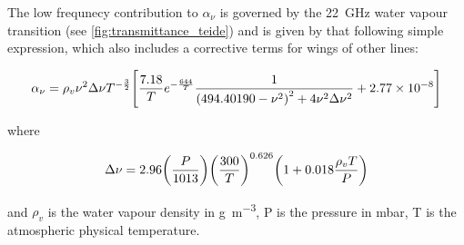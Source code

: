 The low frequnecy contribution to $\alpha_\nu$ is governed by the
\SI{22}{\giga\hertz} water vapour transition (see
\autoref{fig:transmittance_teide}) and is given by that following simple
expression, which also includes a corrective terms for wings of other
lines:

\begin{equation}
        \alpha_\nu = \rho_v\nu^2\Delta \nu T^{-\frac{3}{2}}
        \qty[\frac{7.18}{T} e^{-\frac{644}{T}}
        \frac{1}{\qty(494.40190 - \nu^2)^2 + 4\nu^2\Delta \nu^2}
        + \num{2.77e-8}]
\end{equation}

where

\begin{equation}
        \Delta \nu = 2.96\qty(\frac{P}{1013})\qty(\frac{300}{T})^{0.626}
        \qty(1 + 0.018\frac{\rho_v T}{P})
\end{equation}

and $\rho_v$ is the water vapour density in \si{\gram\per\cubic\meter}, P
is the pressure in \si{\milli\bar}, T is the atmospheric physical
temperature.

